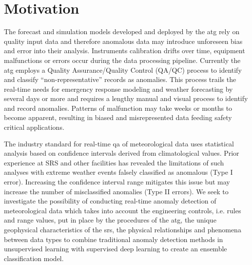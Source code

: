 \section{Motivation}
\label{sec:motivation}

The forecast and simulation models developed and deployed by the \gls{atg} rely on quality input data  and therefore anomalous data may introduce unforeseen bias and error into their analysis. Instruments calibration drifts over time, equipment malfunctions or errors occur during the data processing pipeline. Currently the \gls{atg} employs a Quality Assurance/Quality Control (QA/QC) process to identify and classify “non-representative” records as anomalies.  This process trails the real-time needs for emergency response modeling and weather forecasting by several days or more and requires a lengthy manual and visual process to identify and record anomalies.  Patterns of malfunction may take weeks or months to become apparent, resulting in biased and misrepresented data feeding safety critical applications.

The industry standard for real-time \gls{qa} of meteorological data uses statistical analysis based on confidence intervals derived from climatological values. Prior experience at SRS and other facilities has revealed the limitations of such analyses with extreme weather events falsely classified as anomalous (Type I error). Increasing the confidence interval range mitigates this issue but may increase the number of misclassified anomalies (Type II errors). We seek to investigate the possibility of conducting real-time anomaly detection of meteorological data which takes into account the engineering controls, i.e. rules and range values, put in place by the procedures of the \gls{atg}, the unique geophysical characteristics of the \gls{srs}, the physical relationships and phenomena between data types to combine traditional anomaly detection methods in unsupervised learning with supervised deep learning to create an ensemble classification model.
